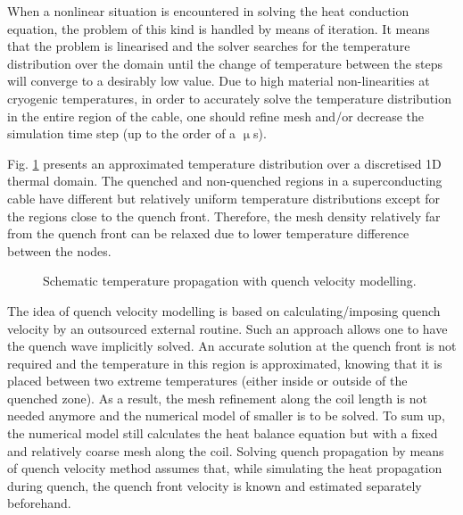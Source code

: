 
When a nonlinear situation is encountered in solving the heat conduction equation, the problem of this kind is handled by means of iteration. It means that the problem is linearised and the solver searches for the temperature distribution over the domain until the change of temperature between the steps will converge to a desirably low value. Due to high material non-linearities at cryogenic temperatures, in order to accurately solve the temperature distribution in the entire region of the cable, one should refine mesh and/or decrease the simulation time step (up to the order of a $\upmu$s).

Fig. \ref{fig:modelling_approach} presents an approximated temperature distribution over a discretised 1D thermal domain. The quenched and non-quenched regions in a superconducting cable have different but relatively uniform temperature distributions except for the regions close to the quench front. Therefore, the mesh density relatively far from the quench front can be relaxed due to lower temperature difference between the nodes. 

\begin{figure}[H]
\centering
{}
\caption{Schematic temperature propagation with quench velocity modelling.}
\label{fig:modelling_approach}
\end{figure}

The idea of quench velocity modelling is based on calculating/imposing quench velocity by an outsourced external routine. Such an approach allows one to have the quench wave implicitly solved. An accurate solution at the quench front is not required and the temperature in this region is approximated, knowing that it is placed between two extreme temperatures (either inside or outside of the quenched zone). As a result, the mesh refinement along the coil length is not needed anymore and the numerical model of smaller is to be solved. To sum up, the numerical model still calculates the heat balance equation but with a fixed and relatively coarse mesh along the coil. Solving quench propagation by means of quench velocity method assumes that, while  simulating the heat propagation during quench, the quench front velocity is known and estimated separately beforehand. 